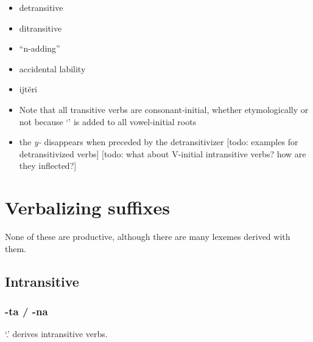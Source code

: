 \documentclass{memoir}
\begin{document}
\begin{itemize}
\item
  detransitive
\item
  ditransitive
\item
  ``n-adding''
\item
  accidental lability
\item
  ijtëri
\item
  Note that all transitive verbs are consonant‑initial, whether
  etymologically or not because  `' is added to all
  vowel‑initial roots
\item
  the \emph{y‑} disappears when preceded by the detransitivizer {[}todo:
  examples for detransitivized verbs{]} {[}todo: what about V-initial
  intransitive verbs? how are they inflected?{]}
\end{itemize}

\section{\texorpdfstring{Verbalizing suffixes
\label{sec:vbz}}{Verbalizing suffixes }}

None of these are productive, although there are many lexemes derived
with them.

\subsection{Intransitive}

\subsubsection{\texorpdfstring{-ta / -na \label{sec:tavbz}}{-ta / -na }}

 `.' derives intransitive verbs.
\end{document}
